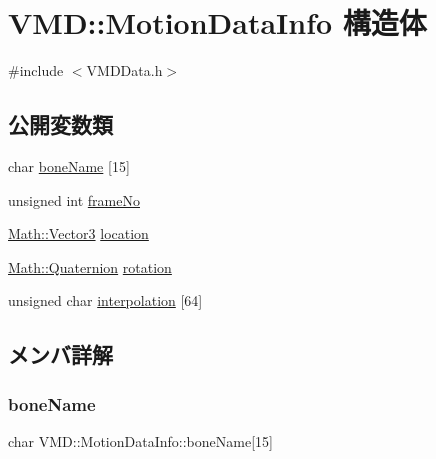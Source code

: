 \hypertarget{struct_v_m_d_1_1_motion_data_info}{}\section{V\+MD\+:\+:Motion\+Data\+Info 構造体}
\label{struct_v_m_d_1_1_motion_data_info}


{\ttfamily \#include $<$V\+M\+D\+Data.\+h$>$}

\subsection*{公開変数類}
\begin{DoxyCompactItemize}
\item 
char \mbox{\hyperlink{struct_v_m_d_1_1_motion_data_info_a3f41fba17ac4f8a28ea482a14a9debed}{bone\+Name}} \mbox{[}15\mbox{]}
\item 
unsigned int \mbox{\hyperlink{struct_v_m_d_1_1_motion_data_info_abf54053643be21af236a19c92a7e7936}{frame\+No}}
\item 
\mbox{\hyperlink{struct_math_1_1_vector3}{Math\+::\+Vector3}} \mbox{\hyperlink{struct_v_m_d_1_1_motion_data_info_a3945794806d41beedea27cebb703ef1b}{location}}
\item 
\mbox{\hyperlink{struct_math_1_1_quaternion}{Math\+::\+Quaternion}} \mbox{\hyperlink{struct_v_m_d_1_1_motion_data_info_a679bcb7bb61761211b4db201120ce6e1}{rotation}}
\item 
unsigned char \mbox{\hyperlink{struct_v_m_d_1_1_motion_data_info_a306b15eb6c36c51ca9d8287810edb61c}{interpolation}} \mbox{[}64\mbox{]}
\end{DoxyCompactItemize}


\subsection{メンバ詳解}
\mbox{\label{struct_v_m_d_1_1_motion_data_info_a3f41fba17ac4f8a28ea482a14a9debed}} 
\subsubsection{\texorpdfstring{bone\+Name}{boneName}}
{\footnotesize\ttfamily char V\+M\+D\+::\+Motion\+Data\+Info\+::bone\+Name\mbox{[}15\mbox{]}}

